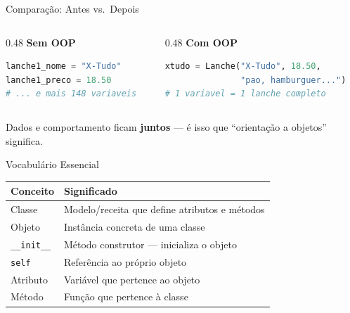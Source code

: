 \documentclass[aspectratio=169]{beamer}
\begin{document}
\begin{frame}[fragile]{Comparação: Antes vs.\ Depois}
  \begin{columns}[T]
    \begin{column}{0.48\textwidth}
      \textbf{Sem OOP}
      \begin{lstlisting}[language=Python, basicstyle=\ttfamily\scriptsize]
lanche1_nome = "X-Tudo"
lanche1_preco = 18.50
# ... e mais 148 variaveis
      \end{lstlisting}
    \end{column}
    \begin{column}{0.48\textwidth}
      \textbf{Com OOP}
      \begin{lstlisting}[language=Python, basicstyle=\ttfamily\scriptsize]
xtudo = Lanche("X-Tudo", 18.50,
               "pao, hamburguer...")
# 1 variavel = 1 lanche completo
      \end{lstlisting}
    \end{column}
  \end{columns}

  \vspace{0.5cm}
  Dados e comportamento ficam \textbf{juntos} --- é isso que
  ``orientação a objetos'' significa.
\end{frame}

\begin{frame}{Vocabulário Essencial}
  \begin{table}
    \centering
    \begin{tabular}{ll}
      \toprule
      \textbf{Conceito} & \textbf{Significado} \\
      \midrule
      Classe         & Modelo/receita que define atributos e métodos \\
      Objeto         & Instância concreta de uma classe \\
      \texttt{\_\_init\_\_}  & Método construtor --- inicializa o objeto \\
      \texttt{self}  & Referência ao próprio objeto \\
      Atributo       & Variável que pertence ao objeto \\
      Método         & Função que pertence à classe \\
      \bottomrule
    \end{tabular}
  \end{table}
\end{frame}
\end{document}
